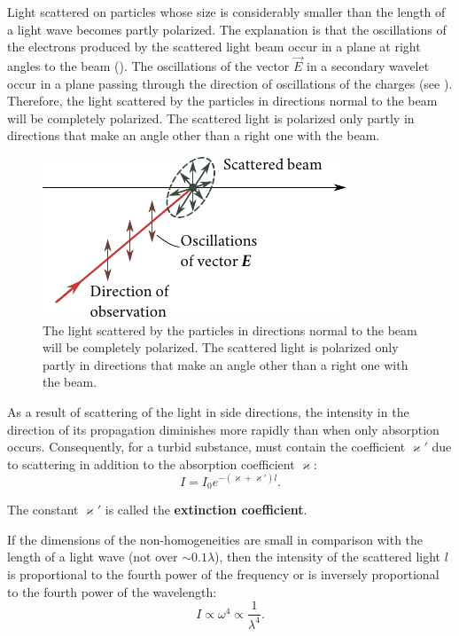 Light scattered on particles whose size is considerably smaller than the length of a light wave becomes partly polarized.
The explanation is that the oscillations of the electrons produced by the scattered light beam occur in a plane at right angles to the beam ().
The oscillations of the vector $\vec{E}$ in a secondary wavelet occur in a plane passing through the direction of oscillations of the charges (see ).
Therefore, the light scattered by the particles in directions normal to the beam will be completely polarized.
The scattered light is polarized only partly in directions that make an angle other than a right one with the beam.

\begin{figure}[t]
	\begin{center}
		\includegraphics[scale=1]{figures/ch_20/fig_20_9.pdf}
        \caption[]{The light scattered by the particles in directions normal to the beam will be completely polarized. The scattered light is polarized only partly in directions that make an angle other than a right one with the beam.}
		\label{fig:20_9}
	\end{center}
	\vspace{-0.8cm}
\end{figure}

As a result of scattering of the light in side directions, the intensity in the direction of its propagation diminishes more rapidly than when only absorption occurs.
Consequently, for a turbid substance,  must contain the coefficient $\varkappa'$ due to scattering in addition to the absorption coefficient $\varkappa$:
\begin{equation}\label{eq:20_25}
	I = I_0 e^{-(\varkappa+\varkappa')l}.
\end{equation}

\noindent
The constant $\varkappa'$ is called the \textbf{extinction coefficient}.

If the dimensions of the non-homogeneities are small in comparison with the length of a light wave (not over $\sim 0.1\lambda$), then the
intensity of the scattered light $l$ is proportional to the fourth power of the frequency or is inversely proportional to the fourth power of the wavelength:
\begin{equation}\label{eq:20_26}
	I \propto \omega^4 \propto \frac{1}{\lambda^4}.
\end{equation}

